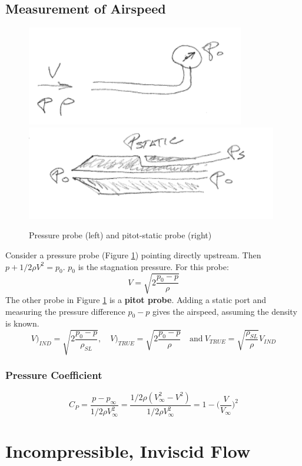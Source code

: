 \documentclass[draft=false, titlepage]{article}
\begin{document}
\subsection{Measurement of Airspeed}
\begin{figure}[ht]
    \centering
    \includegraphics[width=0.3\linewidth]{Figures/pressureProbe.PNG}
    \includegraphics[width=0.3\linewidth]{Figures/pitotStaticProbe.PNG}
    \caption{Pressure probe (left) and pitot-static probe (right)}
    \label{fig:pressureProbes}
\end{figure}
Consider a pressure probe (Figure \ref{fig:pressureProbes}) pointing directly upstream. Then $p + 1/2 \rho V^2 = p_0$. $p_0$ is the stagnation pressure. For this probe:
\begin{equation*}
    V = \sqrt{ 2\frac{p_0-p}{\rho} }
\end{equation*}
The other probe in Figure \ref{fig:pressureProbes} is a \textbf{pitot probe}. Adding a static port and measuring the pressure difference $p_0-p$ gives the airspeed, assuming the density is known.
\begin{equation*}
    V\Big)_{IND} = \sqrt{ 2\frac{p_0-p}{\rho_{SL}} },\quad V\Big)_{TRUE} = \sqrt{2\frac{p_0-p}{\rho}}\quad  \text{and}\ V_{TRUE} = \sqrt{\frac{\rho_{SL}}{\rho}} V_{IND}
\end{equation*}
\subsubsection{Pressure Coefficient}
\begin{equation}
    C_P = \frac{p-p_\infty}{1/2\rho V_\infty^2} =
    \frac{1/2\rho (V_\infty^2 - V^2)}{1/2\rho V_\infty^2} =
    1-\Big(\frac{V}{V_\infty}\Big)^2
    \label{eq:PressureCoefficient}
\end{equation}

\section{Incompressible, Inviscid Flow}
\end{document}
